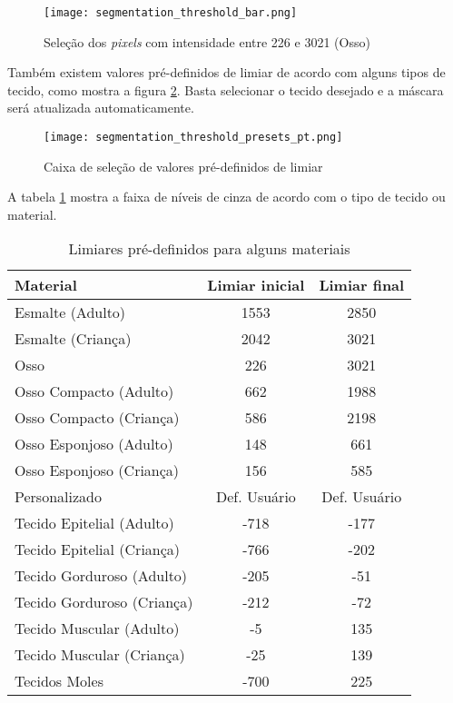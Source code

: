 \begin{figure}[!htb]
\centering
\texttt{[image: segmentation\_threshold\_bar.png]}
\caption{Seleção dos \textit{pixels} com intensidade entre 226 e 3021 (Osso)}
\label{fig:region_selection_bar}
\end{figure}

Também existem valores pré-definidos de limiar de acordo com alguns tipos de tecido, como mostra a
figura \ref{fig:limiar_presets}. Basta selecionar o tecido desejado e a máscara será atualizada
automaticamente.

\begin{figure}[!htb]
\centering
\texttt{[image: segmentation\_threshold\_presets\_pt.png]}
\caption{Caixa de seleção de valores pré-definidos de limiar}
\label{fig:limiar_presets}
\end{figure}

A tabela \ref{tab:limiar} mostra a faixa de níveis de cinza de acordo com o tipo de tecido ou material.

\begin{table}[h]
\centering
\caption{Limiares pré-definidos para alguns materiais}
\begin{tabular}{lcc}\\
\hline %
Material & Limiar inicial & Limiar final\\
\hline
\hline
Esmalte (Adulto) & 1553 & 2850\\
Esmalte (Criança) & 2042 & 3021\\
Osso & 226 & 3021\\
Osso Compacto (Adulto) & 662 & 1988\\
Osso Compacto (Criança) & 586 & 2198\\
Osso Esponjoso (Adulto) & 148 & 661\\
Osso Esponjoso (Criança) & 156 & 585\\
Personalizado & Def. Usuário & Def. Usuário\\
Tecido Epitelial (Adulto) & -718 & -177\\
Tecido Epitelial (Criança) & -766 & -202\\
Tecido Gorduroso (Adulto) & -205 & -51\\
Tecido Gorduroso (Criança) & -212 & -72\\
Tecido Muscular (Adulto) & -5 & 135\\
Tecido Muscular (Criança) & -25 & 139\\
Tecidos Moles & -700 & 225\\
\hline
\end{tabular}
\label{tab:limiar}
\end{table} 
\newpage

